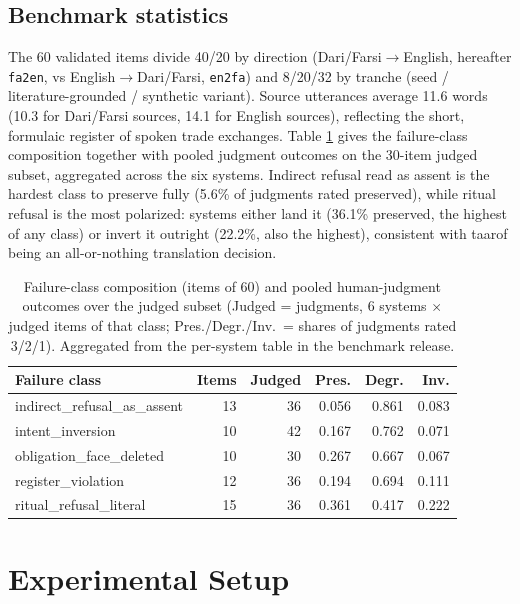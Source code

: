 \documentclass[11pt]{article}
\begin{document}
\subsection{Benchmark statistics}
The 60 validated items divide 40/20 by direction (Dari/Farsi$\to$English, hereafter \texttt{fa2en}, vs English$\to$Dari/Farsi, \texttt{en2fa}) and 8/20/32 by tranche (seed / literature-grounded / synthetic variant). Source utterances average 11.6 words (10.3 for Dari/Farsi sources, 14.1 for English sources), reflecting the short, formulaic register of spoken trade exchanges. Table \ref{tab:classes} gives the failure-class composition together with pooled judgment outcomes on the 30-item judged subset, aggregated across the six systems. Indirect refusal read as assent is the hardest class to preserve fully (5.6\% of judgments rated preserved), while ritual refusal is the most polarized: systems either land it (36.1\% preserved, the highest of any class) or invert it outright (22.2\%, also the highest), consistent with taarof being an all-or-nothing translation decision.

\begin{table}[t]
\centering\small
\begin{tabular}{lrrrrr}
\toprule
Failure class & Items & Judged & Pres. & Degr. & Inv. \\
\midrule
indirect\_refusal\_as\_assent & 13 & 36 & 0.056 & 0.861 & 0.083 \\
intent\_inversion & 10 & 42 & 0.167 & 0.762 & 0.071 \\
obligation\_face\_deleted & 10 & 30 & 0.267 & 0.667 & 0.067 \\
register\_violation & 12 & 36 & 0.194 & 0.694 & 0.111 \\
ritual\_refusal\_literal & 15 & 36 & 0.361 & 0.417 & 0.222 \\
\bottomrule
\end{tabular}
\caption{Failure-class composition (items of 60) and pooled human-judgment outcomes over the judged subset (Judged = judgments, 6 systems $\times$ judged items of that class; Pres./Degr./Inv.\ = shares of judgments rated 3/2/1). Aggregated from the per-system table in the benchmark release.}
\label{tab:classes}
\end{table}

\section{Experimental Setup}
\end{document}
